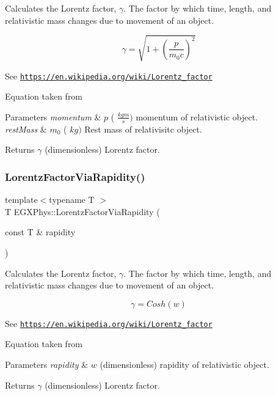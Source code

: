 Calculates the Lorentz factor, $\gamma$. The factor by which time, length, and relativistic mass changes due to movement of an object. 

\[\gamma=\sqrt{1+(\frac{p}{m_0 c})^2}\]

See \href{https://en.wikipedia.org/wiki/Lorentz_factor}{\tt https\+://en.\+wikipedia.\+org/wiki/\+Lorentz\+\_\+factor}

Equation taken from


\begin{DoxyParams}{Parameters}
{\em momentum} & $p$ ( $\frac{kg m}{s})$ momentum of relativistic object. \\
\hline
{\em rest\+Mass} & $m_0$ ( $kg)$ Rest mass of relativisitc object. \\
\hline
\end{DoxyParams}
\begin{DoxyReturn}{Returns}
$\gamma$ (dimensionless) Lorentz factor. 
\end{DoxyReturn}
\mbox{\label{group___lorentz_factor_ga8064f5bce1d2ca5f7bc39d95ba4d2dd9}} 
\subsubsection{\texorpdfstring{Lorentz\+Factor\+Via\+Rapidity()}{LorentzFactorViaRapidity()}}
{\footnotesize\ttfamily template$<$typename T $>$ \\
T E\+G\+X\+Phys\+::\+Lorentz\+Factor\+Via\+Rapidity (\begin{DoxyParamCaption}\item[{const T \&}]{rapidity }\end{DoxyParamCaption})}



Calculates the Lorentz factor, $\gamma$. The factor by which time, length, and relativistic mass changes due to movement of an object. 

\[\gamma=Cosh(w)\]

See \href{https://en.wikipedia.org/wiki/Lorentz_factor}{\tt https\+://en.\+wikipedia.\+org/wiki/\+Lorentz\+\_\+factor}

Equation taken from


\begin{DoxyParams}{Parameters}
{\em rapidity} & $w$ (dimensionless) rapidity of relativistic object. \\
\hline
\end{DoxyParams}
\begin{DoxyReturn}{Returns}
$\gamma$ (dimensionless) Lorentz factor. 
\end{DoxyReturn}
